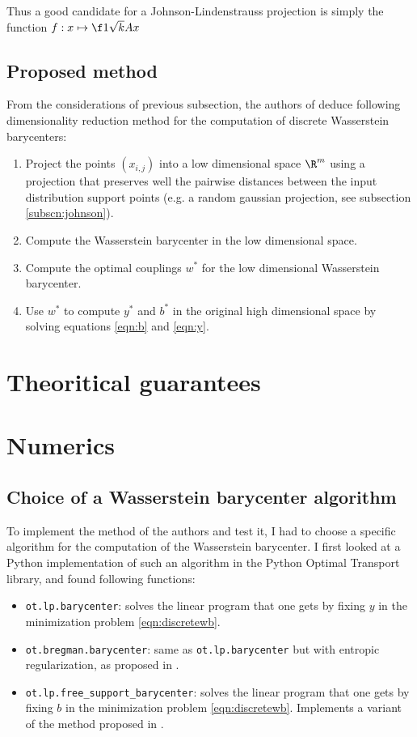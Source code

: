 \documentclass[11pt,a4paper]{article}
\begin{document}
Thus a good candidate for a Johnson-Lindenstrauss projection is simply the function $f: x \mapsto \f 1 {\sqrt k} A x$

\subsection{Proposed method}

From the considerations of previous subsection, the authors of \cite{izzo_dimensionality_2021} deduce following dimensionality reduction method for the computation of discrete Wasserstein barycenters:

\begin{enumerate}
    \item Project the points $(x_{i, j})$ into a low dimensional space $\R^m$ using a projection that preserves well the pairwise distances between the input distribution support points (e.g. a random gaussian projection, see subsection \ref{subscn:johnson}).
    \item Compute the Wasserstein barycenter in the low dimensional space.
    \item Compute the optimal couplings $w^*$ for the low dimensional Wasserstein barycenter.
    \item Use $w^*$ to compute $y^*$ and $b^*$ in the original high dimensional space by solving equations \ref{eqn:b} and \ref{eqn:y}.
\end{enumerate}

\section{Theoritical guarantees}



\section{Numerics}

\subsection{Choice of a Wasserstein barycenter algorithm}

To implement the method of the authors and test it, I had to choose a specific algorithm for the computation of the Wasserstein barycenter. I first looked at a Python implementation of such an algorithm in the Python Optimal Transport library, and found following functions:

\begin{itemize}
    \item \verb|ot.lp.barycenter|: solves the linear program that one gets by fixing $y$ in the minimization problem \ref{eqn:discretewb}.
    \item \verb|ot.bregman.barycenter|: same as \verb|ot.lp.barycenter| but with entropic regularization, as proposed in \cite{benamou_iterative_2015}.
    \item \verb|ot.lp.free_support_barycenter|: solves the linear program that one gets by fixing $b$ in the minimization problem \ref{eqn:discretewb}. Implements a variant of the method proposed in \cite{cuturi_fast_2014}.
\end{itemize}
\end{document}
